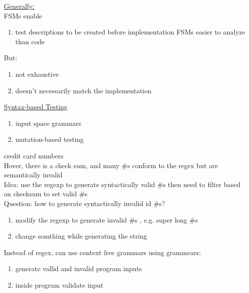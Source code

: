 \documentclass[10pt,usletter]{article}
\begin{document}
\underline{Generally:}\\
FSMs enable
\begin{enumerate}
\item test descriptions to be created before implementation FSMs easier to analyze than code
\end{enumerate}
But:
\begin{enumerate}
\item not exhaustive
\item doesn't necessarily match the implementation
\end{enumerate}

\underline{Syntax-based Testing}\\
\begin{enumerate}
\item input space grammars
\item mutation-based testing
\end{enumerate}

credit card numbers \\
Hover, there is a check sum, and many \#s conform to the regex but are semantically invalid\\
Idea: use the regexp to generate syntactically valid \#s then need to filter based on checksum to set valid \#s\\
Question: how to generate syntactically invalid id \#s?
\begin{enumerate}
\item modify the regexp to generate invalid \#s , e.g. super long \#s
\item change somthing while generating the string
\end{enumerate}

Instead of regex, can use context free grammars using grammears:
\begin{enumerate}
\item generate vallid and invalid program inputs
\item inside program validate input
\end{enumerate}
\end{document}
